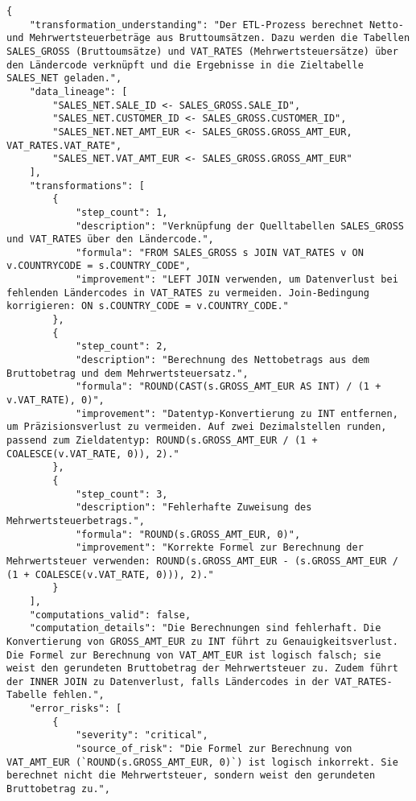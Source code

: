 \begin{lstlisting}[caption={Ausgabe: GEMINI 2.5 Pro Anwendungsfall 5 Konsistenzdurchlauf},label={gemini_case5_prompt2}]
{
    "transformation_understanding": "Der ETL-Prozess berechnet Netto- und Mehrwertsteuerbeträge aus Bruttoumsätzen. Dazu werden die Tabellen SALES_GROSS (Bruttoumsätze) und VAT_RATES (Mehrwertsteuersätze) über den Ländercode verknüpft und die Ergebnisse in die Zieltabelle SALES_NET geladen.",
    "data_lineage": [
        "SALES_NET.SALE_ID <- SALES_GROSS.SALE_ID",
        "SALES_NET.CUSTOMER_ID <- SALES_GROSS.CUSTOMER_ID",
        "SALES_NET.NET_AMT_EUR <- SALES_GROSS.GROSS_AMT_EUR, VAT_RATES.VAT_RATE",
        "SALES_NET.VAT_AMT_EUR <- SALES_GROSS.GROSS_AMT_EUR"
    ],
    "transformations": [
        {
            "step_count": 1,
            "description": "Verknüpfung der Quelltabellen SALES_GROSS und VAT_RATES über den Ländercode.",
            "formula": "FROM SALES_GROSS s JOIN VAT_RATES v ON v.COUNTRYCODE = s.COUNTRY_CODE",
            "improvement": "LEFT JOIN verwenden, um Datenverlust bei fehlenden Ländercodes in VAT_RATES zu vermeiden. Join-Bedingung korrigieren: ON s.COUNTRY_CODE = v.COUNTRY_CODE."
        },
        {
            "step_count": 2,
            "description": "Berechnung des Nettobetrags aus dem Bruttobetrag und dem Mehrwertsteuersatz.",
            "formula": "ROUND(CAST(s.GROSS_AMT_EUR AS INT) / (1 + v.VAT_RATE), 0)",
            "improvement": "Datentyp-Konvertierung zu INT entfernen, um Präzisionsverlust zu vermeiden. Auf zwei Dezimalstellen runden, passend zum Zieldatentyp: ROUND(s.GROSS_AMT_EUR / (1 + COALESCE(v.VAT_RATE, 0)), 2)."
        },
        {
            "step_count": 3,
            "description": "Fehlerhafte Zuweisung des Mehrwertsteuerbetrags.",
            "formula": "ROUND(s.GROSS_AMT_EUR, 0)",
            "improvement": "Korrekte Formel zur Berechnung der Mehrwertsteuer verwenden: ROUND(s.GROSS_AMT_EUR - (s.GROSS_AMT_EUR / (1 + COALESCE(v.VAT_RATE, 0))), 2)."
        }
    ],
    "computations_valid": false,
    "computation_details": "Die Berechnungen sind fehlerhaft. Die Konvertierung von GROSS_AMT_EUR zu INT führt zu Genauigkeitsverlust. Die Formel zur Berechnung von VAT_AMT_EUR ist logisch falsch; sie weist den gerundeten Bruttobetrag der Mehrwertsteuer zu. Zudem führt der INNER JOIN zu Datenverlust, falls Ländercodes in der VAT_RATES-Tabelle fehlen.",
    "error_risks": [
        {
            "severity": "critical",
            "source_of_risk": "Die Formel zur Berechnung von VAT_AMT_EUR (`ROUND(s.GROSS_AMT_EUR, 0)`) ist logisch inkorrekt. Sie berechnet nicht die Mehrwertsteuer, sondern weist den gerundeten Bruttobetrag zu.",

\end{lstlisting}
